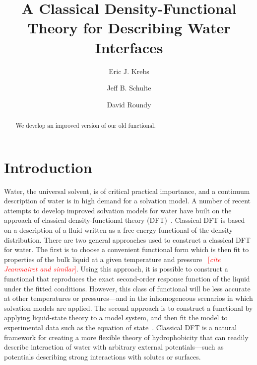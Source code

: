 \documentclass[twocolumn,amsmath,amssymb,prl]{revtex4-1}
\newcommand{\fixme}[1]{\textcolor{red}{[\emph{#1}]}}
\begin{document}
\title{A Classical Density-Functional Theory for Describing Water Interfaces}

\author{Eric J. Krebs}
\author{Jeff B. Schulte}
\author{David Roundy}

\begin{abstract}
We develop an improved version of our old functional.
\end{abstract}
\maketitle

\section{Introduction}

Water, the universal solvent, is of critical practical importance, and
a continuum description of water is in high demand for a solvation
model.  A number of recent attempts to develop improved solvation
models for water have built on the approach of classical
density-functional theory (DFT)~\cite{jeanmairet2013molecular,
  zhao2011molecular, zhao2011new, ramirez2005direct,
  ramirez2005density, levesque2012solvation, levesque2012scalar}.
Classical DFT is based on a description of a fluid written as a free
energy functional of the density distribution.  There are two general
approaches used to construct a classical DFT for water.  The first is
to choose a convenient functional form which is then fit to properties
of the bulk liquid at a given temperature and pressure
\cite{jeanmairet2013molecular, lischner2010classical} ~\fixme{cite
  Jeanmairet and similar}.  Using this approach, it is possible to
construct a functional that reproduces the exact second-order response
function of the liquid under the fitted conditions.  However, this
class of functional will be less accurate at other temperatures or
pressures---and in the inhomogeneous scenarios in which solvation
models are applied.  The second approach is to construct a functional by
applying liquid-state theory to a model system, and then fit the model
to experimental data such as the equation of
state~\cite{hughes2013classical, clark2006developing, gloor2002saft,
  gloor2004accurate, gloor2007prediction, Jaqaman2004, chuev2006,
  fu2005vapor-liquid-dft,kiselev2006new, blas2001examination,
  sundararaman2012computationally}.  Classical DFT is a natural
framework for creating a more flexible theory of hydrophobicity that
can readily describe interaction of water with arbitrary external
potentials---such as potentials describing strong interactions with
solutes or surfaces.
\end{document}
